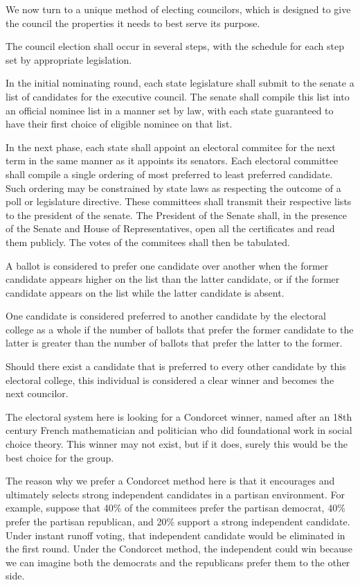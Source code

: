 \documentclass{article}
\begin{document}
We now turn to a unique method of electing councilors, which is designed to give the council the properties it needs to best serve its purpose.

\begin{quoting}
The council election shall occur in several steps, with the schedule for each step set by appropriate legislation.

In the initial nominating round, each state legislature shall submit to the senate a list of candidates for the executive council. The senate shall compile this list into an official nominee list in a manner set by law, with each state guaranteed to have their first choice of eligible nominee on that list.

In the next phase, each state shall appoint an electoral commitee for the next term in the same manner as it appoints its senators. Each electoral committee shall compile a single ordering of most preferred to least preferred candidate. Such ordering may be constrained by state laws as respecting the outcome of a poll or legislature directive. These committees shall transmit their respective lists to the president of the senate.  The President of the Senate shall, in the presence of the Senate and House of Representatives, open all the certificates and read them publicly. The votes of the commitees shall then be tabulated.

A ballot is considered to prefer one candidate over another when the former candidate appears higher on the list than the latter candidate, or if the former candidate appears on the list while the latter candidate is absent.

One candidate is considered preferred to another candidate by the electoral college as a whole if the number of ballots that prefer the former candidate to the latter is greater than the number of ballots that prefer the latter to the former.

Should there exist a candidate that is preferred to every other candidate by this electoral college, this individual is considered a clear winner and becomes the next councilor.
\end{quoting}

The electoral system here is looking for a Condorcet winner, named after an 18th century French mathematician and politician who did foundational work in social choice theory. This winner may not exist, but if it does, surely this would be the best choice for the group.

The reason why we prefer a Condorcet method here is that it encourages and ultimately selects strong independent candidates in a partisan environment. For example, suppose that 40\% of the commitees prefer the partisan democrat, 40\% prefer the partisan republican, and 20\% support a strong independent candidate. Under instant runoff voting, that independent candidate would be eliminated in the first round. Under the Condorcet method, the independent could win because we can imagine both the democrats and the republicans prefer them to the other side.
\end{document}
